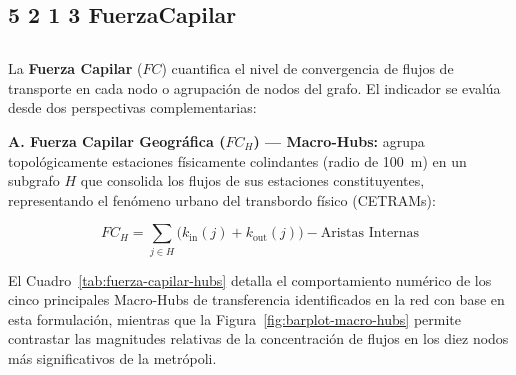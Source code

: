 \subsection*{5 2 1 3 FuerzaCapilar}
\subsection{}
\label{subsec:fuerza-capilar}
\DIFdelbegin %
\DIFdelend 

La \textbf{Fuerza Capilar} ($FC$) cuantifica el nivel de convergencia de flujos
de transporte en cada nodo o agrupación de nodos del grafo. El indicador se
evalúa desde dos perspectivas complementarias:

\textbf{A. Fuerza Capilar Geográfica ($FC_H$) — Macro-Hubs:} agrupa
topológicamente estaciones físicamente colindantes (radio de 100~m) en un
subgrafo $H$ que consolida los flujos de sus estaciones constituyentes,
representando el fenómeno urbano del transbordo físico (CETRAMs):

\begin{equation}
    FC_{H} = \sum_{j \in H} \bigl(k_{\text{in}}(j) + k_{\text{out}}(j)\bigr)
    - \text{Aristas Internas}
    \label{eq:fc-geografica}
\end{equation}

El Cuadro~\ref{tab:fuerza-capilar-hubs} detalla el comportamiento numérico de los
cinco principales Macro-Hubs de transferencia identificados en la red con base en
esta formulación, mientras que la Figura~\ref{fig:barplot-macro-hubs} permite
contrastar las magnitudes relativas de la concentración de flujos en los diez
nodos más significativos de la metrópoli.

